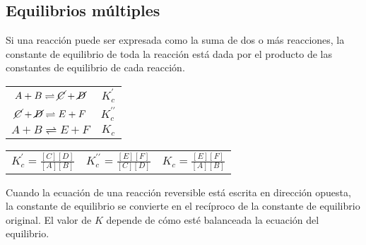     \subsection{Equilibrios múltiples}
    \sangria{} Si una reacción puede ser expresada como la suma de dos o más reacciones, la constante de equilibrio de toda la reacción está dada por el producto de las constantes de equilibrio de cada reacción. \begin{center} \begin{tabular}{c c} \multicolumn{1}{c}{$A + B \rightleftharpoons \cancel{C} + \cancel{D}$} & \multicolumn{1}{c}{$K^{\prime}_c$} \\ \multicolumn{1}{c}{$\cancel{C} + \cancel{D} \rightleftharpoons E + F$} & \multicolumn{1}{c}{$K^{\prime\prime}_c$} \\ \midrule \multicolumn{1}{c}{$A + B \rightleftharpoons E + F$} & \multicolumn{1}{c}{$K_c$} \\ \end{tabular} \end{center} \begin{center} \begin{tabular}{c c c} \multicolumn{1}{c}{$K_c^{\prime} = \frac{[C][D]}{[A][B]}$} & \multicolumn{1}{c}{$K_c^{\prime\prime} = \frac {[E][F]}{[C][D]}$} & \multicolumn{1}{c}{$K_c = \frac{[E][F]}{[A][B]}$} \\ \end{tabular} \end{center}
      \sangria{} Cuando la ecuación de una reacción reversible está escrita en dirección opuesta, la constante de equilibrio se convierte en el recíproco de la constante de equilibrio original.    \sangria{} El valor de $K$ depende de cómo esté balanceada la ecuación del equilibrio.
